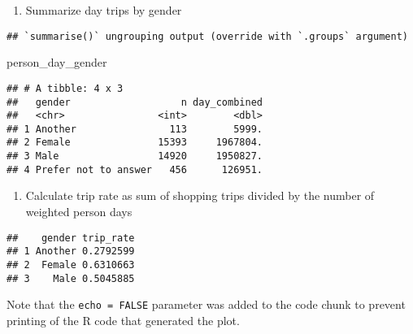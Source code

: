 \documentclass[
]{article}
\newenvironment{Shaded}{\begin{snugshade}}{\end{snugshade}}
\newcommand{\DataTypeTok}[1]{\textcolor[rgb]{0.13,0.29,0.53}{#1}}
\newcommand{\DecValTok}[1]{\textcolor[rgb]{0.00,0.00,0.81}{#1}}
\newcommand{\KeywordTok}[1]{\textcolor[rgb]{0.13,0.29,0.53}{\textbf{#1}}}
\newcommand{\NormalTok}[1]{#1}
\newcommand{\OperatorTok}[1]{\textcolor[rgb]{0.81,0.36,0.00}{\textbf{#1}}}
\newcommand{\StringTok}[1]{\textcolor[rgb]{0.31,0.60,0.02}{#1}}
\providecommand{\tightlist}{%
  \setlength{\itemsep}{0pt}\setlength{\parskip}{0pt}}
\begin{document}
\begin{enumerate}
\def\labelenumi{\arabic{enumi}.}
\setcounter{enumi}{3}
\tightlist
\item
  Summarize day trips by gender
\end{enumerate}

\begin{Shaded}
\end{Shaded}

\begin{verbatim}
## `summarise()` ungrouping output (override with `.groups` argument)
\end{verbatim}

\begin{Shaded}
\begin{Highlighting}[]
\NormalTok{person_day_gender}
\end{Highlighting}
\end{Shaded}

\begin{verbatim}
## # A tibble: 4 x 3
##   gender                   n day_combined
##   <chr>                <int>        <dbl>
## 1 Another                113        5999.
## 2 Female               15393     1967804.
## 3 Male                 14920     1950827.
## 4 Prefer not to answer   456      126951.
\end{verbatim}

\begin{enumerate}
\def\labelenumi{\arabic{enumi}.}
\setcounter{enumi}{4}
\tightlist
\item
  Calculate trip rate as sum of shopping trips divided by the number of
  weighted person days
\end{enumerate}

\begin{Shaded}
\end{Shaded}

\begin{verbatim}
##    gender trip_rate
## 1 Another 0.2792599
## 2  Female 0.6310663
## 3    Male 0.5045885
\end{verbatim}

Note that the \texttt{echo\ =\ FALSE} parameter was added to the code
chunk to prevent printing of the R code that generated the plot.
\end{document}
